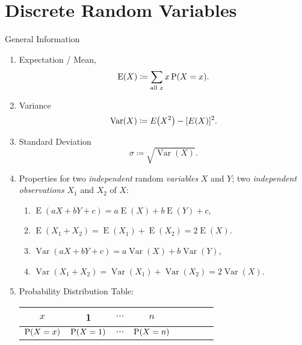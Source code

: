 \documentclass[oneside]{book}
\begin{document}
\chapter{Discrete Random Variables}
\begin{stbox}{General Information}
  \begin{enumerate}
    \item Expectation / Mean, 
    \[\operatorname{E}(X)\coloneq \sum_{\text{all } x}{x\operatorname{P}(X=x)}.\]
    \item Variance 
    \[\operatorname{Var}(X)\coloneq E\hspace{-0.7mm}\left(X^2\right)-[E(X)]^2.\]
    \item Standard Deviation
    \[\sigma\coloneq \sqrt{\operatorname{Var}(X)}.\]
    \item Properties for two \emph{independent} random \emph{variables} \(X\) and \(Y\); two \emph{independent observations} \(X_1\) and \(X_2\) of \(X\):
    \begin{enumerate}
      \item \(\operatorname{E}(aX+bY+c)=a\operatorname{E}(X)+b\operatorname{E}(Y)+c\),
      \item \(\operatorname{E}(X_1+X_2)=\operatorname{E}(X_1)+\operatorname{E}(X_2)=2\operatorname{E}(X)\).
      \item \(\operatorname{Var}(aX+bY+c)=a\operatorname{Var}(X)+b\operatorname{Var}(Y)\),
      \item \(\operatorname{Var}(X_1+X_2)=\operatorname{Var}(X_1)+\operatorname{Var}(X_2)=2\operatorname{Var}(X)\).
    \end{enumerate}
    \item Probability Distribution Table:
    \begin{tabular}{|Sc|Sc|Sc|Sc|}
      \hline
      \(x\) & 1 & \(\cdots\) & \(n\)\\
      \hline
      \(\operatorname{P}(X=x)\) & \(\operatorname{P}(X=1)\) & \(\cdots\) & \(\operatorname{P}(X=n)\)\\
      \hline
    \end{tabular}
  \end{enumerate}
\end{stbox}
\end{document}
